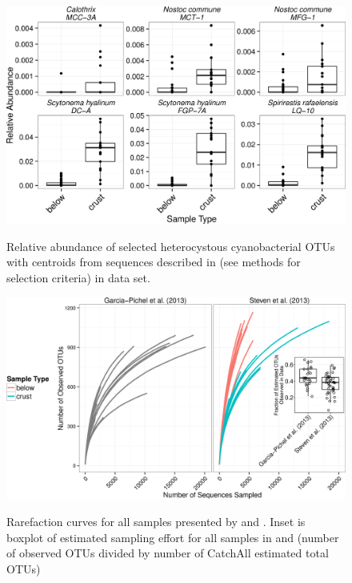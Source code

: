\begin{figure}[H]
  \centering
  \caption{Relative abundance of selected heterocystous cyanobacterial OTUs with centroids from sequences described in \citet{Yeager} (see methods for selection criteria) in \citet{Steven_2013} data set.}
    \includegraphics[width=1.0\textwidth]{figures/het_cyano_steven2013/het_cyano_steven2013.png}
  \label{fig:het_steven}
\end{figure}

\begin{figure}[H]
  \centering
  \caption{Rarefaction curves for all samples presented by \citet{Garcia_Pichel_2013} and \citet{Steven_2013}. Inset is boxplot of estimated sampling effort for all samples in \citet{Garcia_Pichel_2013} and \citet{Steven_2013} (number of observed OTUs divided by number of CatchAll \cite{BUNGE_2010} estimated total OTUs)}
    \includegraphics[width=1.0\textwidth]{figures/rarefacation_curves1/raref_and_boxplot.png}
  \label{fig:rarefaction}
\end{figure}

